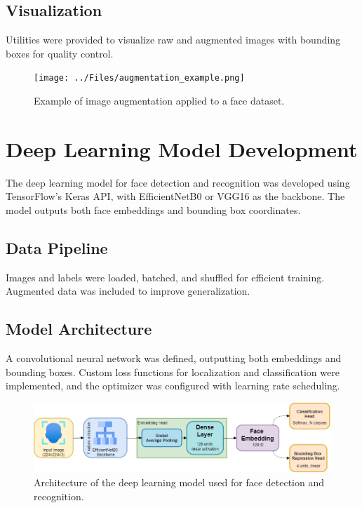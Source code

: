 \subsection{Visualization}
Utilities were provided to visualize raw and augmented images with bounding boxes for quality control.

\begin{figure}[ht!]
    \centering
    \texttt{[image: ../Files/augmentation\_example.png]}
    \caption{Example of image augmentation applied to a face dataset.}
    \label{fig:augmentation-example}
\end{figure}

\section{Deep Learning Model Development}

The deep learning model for face detection and recognition was developed using TensorFlow's Keras API, with EfficientNetB0 or VGG16 as the backbone. The model outputs both face embeddings and bounding box coordinates.

\subsection{Data Pipeline}
Images and labels were loaded, batched, and shuffled for efficient training. Augmented data was included to improve generalization.

\subsection{Model Architecture}
A convolutional neural network was defined, outputting both embeddings and bounding boxes. Custom loss functions for localization and classification were implemented, and the optimizer was configured with learning rate scheduling.

\begin{figure}[ht!]
    \centering
    \includegraphics[width=1\textwidth]{../Files/model_architecture.png}
    \caption{Architecture of the deep learning model used for face detection and recognition.}
    \label{fig:model-architecture}
\end{figure}

